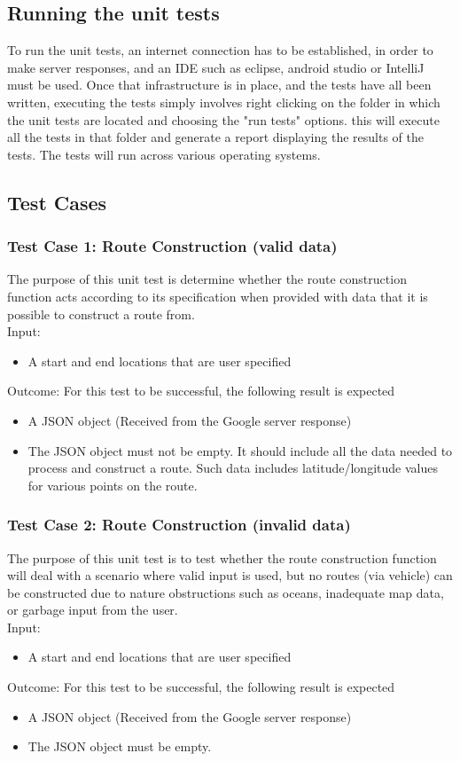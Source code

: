 \documentclass{article}
\begin{document}
\subsection{Running the unit tests}
To run the unit tests, an internet connection has to be established, in order to make server responses, and an IDE such as eclipse, android studio or IntelliJ must be used. Once that infrastructure is in place, and the tests have all been written, executing the tests simply involves right clicking on the folder in which the unit tests are located and choosing the "run tests" options. this will execute all the tests in that folder and generate a report displaying the results of the tests. The tests will run across various operating systems.
\subsection{Test Cases}
\subsubsection{Test Case 1: Route Construction (valid data)}
The purpose of this unit test is determine whether the route construction function acts according to its specification when provided with data that it is possible to construct a route from.\\Input: \begin{itemize}
\item A start and end locations that are user specified
\end{itemize}
Outcome: For this test to be successful, the following result is expected
\begin{itemize}
\item A JSON object (Received from the Google server response)
\item The JSON object must not be empty. It should include all the data needed to process and construct a route. Such data includes latitude/longitude values for various points on the route.
\end{itemize}
\subsubsection{Test Case 2: Route Construction (invalid data)}
The purpose of this unit test is to test whether the route construction function will deal with a scenario where valid input is used, but no routes (via vehicle) can be constructed due to nature obstructions such as oceans, inadequate map data, or garbage input from the user.
\\Input: \begin{itemize}
\item A start and end locations that are user specified
\end{itemize}
Outcome: For this test to be successful, the following result is expected
\begin{itemize}
\item A JSON object (Received from the Google server response)
\item The JSON object must be empty.
\end{itemize}
\end{document}
